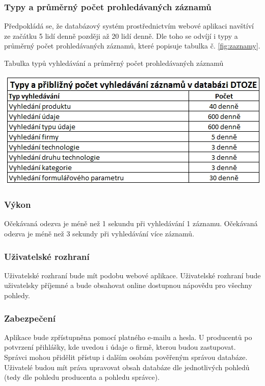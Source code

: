 \documentclass[11pt,a4paper]{article}
\begin{document}
\subsubsection{Typy a průměrný počet prohledávaných záznamů}
Předpokládá se, že databázový systém prostřednictvím webové aplikaci navštíví ze začátku 5 lidí denně později až 20 lidí denně. Dle toho se odvíjí i typy a průměrný počet prohledávaných záznamů, které popisuje tabulka č. \ref{fig:zaznamy}.

\begin{table}[H] 
\centering 
\caption{Tabulka typů vyhledávání a průměrný počet prohledávaných záznamů} 
\includegraphics[scale=0.45]{vize_DTOZE_UC_vyhled} 
\label{fig:zaznamy}
\end{table} 

\subsubsection{Výkon}
Očekávaná odezva je méně než 1 sekundu při vyhledávání 1 záznamu.
Očekávaná odezva je méně než 3 sekundy při vyhledávání více záznamů.

\subsubsection{Uživatelské rozhraní}
Uživatelské rozhraní bude mít podobu webové aplikace. Uživatelské rozhraní bude uživatelsky příjemné a bude obsahovat online dostupnou nápovědu pro všechny pohledy. 

\subsubsection{Zabezpečení}
Aplikace bude zpřístupněna pomocí platného e-mailu a hesla. U producentů po potvrzení přihlášky, kde uvedou i údaje o firmě, kterou budou zastupovat. Správci mohou přidělit přístup i dalším osobám pověřeným správou databáze. Uživatelé budou mít práva upravovat obsah databáze dle jednotlivých pohledů (tedy dle pohledu producenta a pohledu správce).
\end{document}
